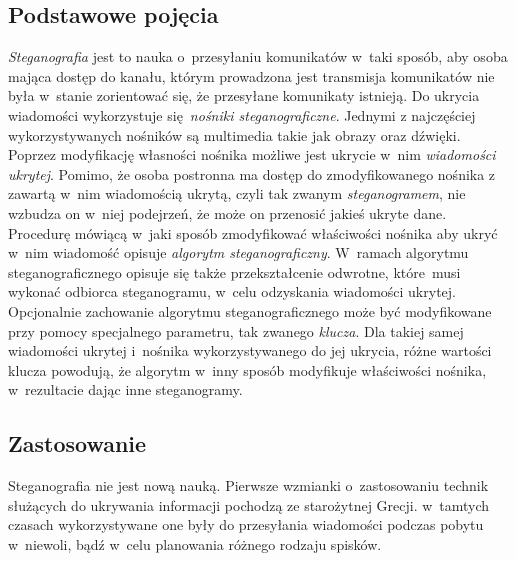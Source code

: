 \documentclass[a4paper, twoside, 12pt]{report}
\begin{document}
        \subsection{Podstawowe pojęcia} \label{STEGANOGRAFIAPOJECIA}
        \emph{Steganografia} jest to nauka o~przesyłaniu komunikatów w~taki sposób, aby
        osoba mająca dostęp do kanału, którym prowadzona jest transmisja komunikatów
        nie była w~stanie zorientować się, że przesyłane komunikaty istnieją.
        Do ukrycia wiadomości wykorzystuje się \emph{nośniki steganograficzne}\cite{STEGANOGRAFIASIECIOWAART}.
        Jednymi z najczęściej wykorzystywanych nośników są multimedia takie jak
        obrazy oraz dźwięki. Poprzez modyfikację własności nośnika możliwe jest
        ukrycie w~nim \emph{wiadomości ukrytej}. Pomimo, że osoba postronna ma
        dostęp do zmodyfikowanego nośnika z zawartą w~nim wiadomością ukrytą,
        czyli tak zwanym \emph{steganogramem}, nie wzbudza on w~niej podejrzeń,
        że może on przenosić jakieś ukryte dane. Procedurę mówiącą w~jaki sposób
        zmodyfikować właściwości nośnika aby ukryć w~nim wiadomość opisuje
        \emph{algorytm steganograficzny}. W~ramach algorytmu steganograficznego
        opisuje się także przekształcenie odwrotne, które musi
        wykonać odbiorca steganogramu, w~celu odzyskania wiadomości ukrytej.
        Opcjonalnie zachowanie algorytmu steganograficznego może być modyfikowane przy pomocy specjalnego
        parametru, tak zwanego \emph{klucza}.  Dla takiej samej wiadomości ukrytej i~nośnika
        wykorzystywanego do jej ukrycia, różne wartości klucza powodują, że algorytm
        w~inny sposób modyfikuje właściwości nośnika, w~rezultacie dając inne
        steganogramy.

        \subsection{Zastosowanie}
        Steganografia nie jest nową nauką. Pierwsze wzmianki o~zastosowaniu technik
        służących do ukrywania informacji pochodzą ze starożytnej Grecji\cite{STEGANOGRAPHYINTRO}.
        w~tamtych czasach wykorzystywane one były do przesyłania wiadomości
        podczas pobytu w~niewoli, bądź w~celu planowania różnego rodzaju spisków.
\end{document}
